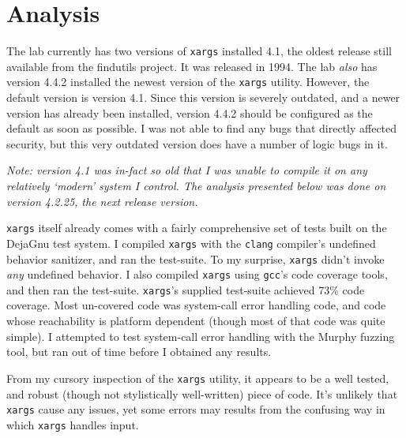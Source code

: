 \documentclass{article}
\newcommand{\xargs}{\texttt{xargs} }
\begin{document}
\vspace{-2ex}
\section{Analysis}
\vspace{-1ex}
The lab currently has two versions of \xargs installed 4.1, the oldest
release still available from the findutils project. It was released in 1994. The
lab \textit{also} has version 4.4.2 installed the newest version of the \xargs
utility. However, the default version is version 4.1. Since this version is
severely outdated, and a newer version has already been installed, version 4.4.2
should be configured as the default as soon as possible. I was not able to find
any bugs that directly affected security, but this very outdated version does
have a number of logic bugs in it.

\begin{center}
\parbox[c][1cm][c]{0.7\linewidth}{
    {\small \it Note: version 4.1 was in-fact so old that I was unable to compile it
     on any relatively `modern' system I control. The analysis presented below
     was done on version 4.2.25, the next release version.}
}
\end{center}

\xargs itself already comes with a fairly comprehensive set of tests built
on the DejaGnu test system. I compiled \xargs with the \texttt{clang} compiler's 
undefined behavior sanitizer, and ran the test-suite. To my surprise, 
\xargs didn't invoke \textit{any} undefined behavior. I also compiled \xargs 
using \texttt{gcc}'s code coverage tools, and then ran the test-suite. 
\texttt{xargs}'s supplied test-suite achieved 73\% code coverage. Most 
un-covered code was system-call error handling code, and code whose reachability
is platform dependent (though most of that code was quite simple). I attempted
to test system-call error handling with the Murphy fuzzing tool, but ran out
of time before I obtained any results.

From my cursory inspection of the \xargs utility, it appears to be a well
tested, and robust (though not stylistically well-written) piece of code.
It's unlikely that \xargs cause any issues, yet some
errors may results from the confusing way in which \xargs handles input.
\end{document}

